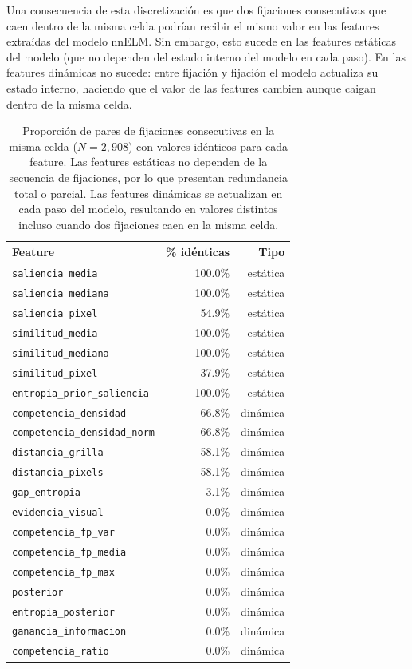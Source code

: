 Una consecuencia de esta discretización es que dos fijaciones consecutivas que caen dentro de la misma celda podrían recibir el mismo valor en las features extraídas del modelo nnELM. Sin embargo, esto sucede en las features estáticas del modelo (que no dependen del estado interno del modelo en cada paso). En las features dinámicas no sucede: entre fijación y fijación el modelo actualiza su estado interno, haciendo que el valor de las features cambien aunque caigan dentro de la misma celda. 


\begin{table}[h]
\centering
\small
\begin{tabular}{lrr}
\toprule
Feature & \% idénticas & Tipo \\
\midrule
\texttt{saliencia\_media}              & 100.0\% & estática \\
\texttt{saliencia\_mediana}            & 100.0\% & estática \\
\texttt{saliencia\_pixel}              &  54.9\% & estática \\
\texttt{similitud\_media}              & 100.0\% & estática \\
\texttt{similitud\_mediana}            & 100.0\% & estática \\
\texttt{similitud\_pixel}              &  37.9\% & estática \\
\texttt{entropia\_prior\_saliencia}    & 100.0\% & estática \\
\midrule
\texttt{competencia\_densidad}         &  66.8\% & dinámica \\
\texttt{competencia\_densidad\_norm}   &  66.8\% & dinámica \\
\texttt{distancia\_grilla}             &  58.1\% & dinámica \\
\texttt{distancia\_pixels}             &  58.1\% & dinámica \\
\texttt{gap\_entropia}                 &   3.1\% & dinámica \\
\texttt{evidencia\_visual}             &   0.0\% & dinámica \\
\texttt{competencia\_fp\_var}          &   0.0\% & dinámica \\
\texttt{competencia\_fp\_media}        &   0.0\% & dinámica \\
\texttt{competencia\_fp\_max}          &   0.0\% & dinámica \\
\texttt{posterior}                     &   0.0\% & dinámica \\
\texttt{entropia\_posterior}           &   0.0\% & dinámica \\
\texttt{ganancia\_informacion}         &   0.0\% & dinámica \\
\texttt{competencia\_ratio}            &   0.0\% & dinámica \\
\bottomrule
\end{tabular}
\caption{Proporción de pares de fijaciones consecutivas en la misma celda 
($N = 2{,}908$) con valores idénticos para cada feature. Las features estáticas 
no dependen de la secuencia de fijaciones, por lo que presentan redundancia 
total o parcial. Las features dinámicas se actualizan en cada paso del modelo, 
resultando en valores distintos incluso cuando dos fijaciones caen en la misma celda.}
\label{tab:pares_celda}
\end{table}